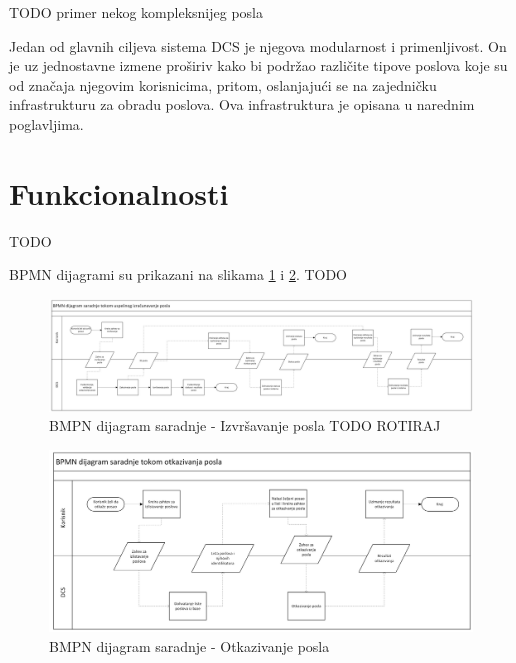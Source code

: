 \documentclass[12pt,oneside]{memoir}
\begin{document}
TODO primer nekog kompleksnijeg posla

Jedan od glavnih ciljeva sistema DCS je njegova modularnost i primenljivost. On je uz jednostavne izmene proširiv kako bi podržao različite tipove poslova koje su od značaja njegovim korisnicima, pritom, oslanjajući se na zajedničku infrastrukturu za obradu poslova. Ova infrastruktura je opisana u narednim poglavljima.


\section{Funkcionalnosti}
\label{chp:opisfunkc}

TODO 

BPMN dijagrami su prikazani na slikama \ref{fig:bpmn_korisnik} i \ref{fig:bpmn_otkazivanje}. TODO

\begin{figure}[!ht]
  \centering
  \includegraphics[width=1\textwidth]{./images/BPMN_dijagram_saradnje_korisnik_dsc.png}
  \caption{BMPN dijagram saradnje - Izvršavanje posla TODO ROTIRAJ}
  \label{fig:bpmn_korisnik}
\end{figure}

\begin{figure}[!ht]
  \centering
  \includegraphics[width=1\textwidth]{./images/BPMN_dijagram_saradnje_otkazivanje.png}
  \caption{BMPN dijagram saradnje - Otkazivanje posla}
  \label{fig:bpmn_otkazivanje}
\end{figure}
\end{document}
